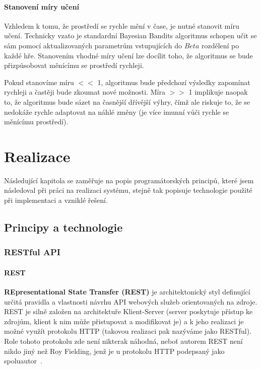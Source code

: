 \documentclass[thesis=M,czech]{FITthesis}[2014/05/07]
\begin{document}
\subsubsection{Stanovení míry učení}
Vzhledem k tomu, že prostředí se rychle mění v čase, je nutné stanovit míru učení. Technicky vzato je standardní Bayesian Bandits algoritmus schopen učit se sám pomocí aktualizovaných parametrům vstupujících do ${Beta}$ rozdělení po každé hře. Stanovením vhodné míry učení lze docílit toho, že algoritmus se bude přizpůsobovat měnícímu se prostředí rychleji.

Pokud stanovíme míru $<<$ 1, algoritmus bude předchozí výsledky zapomínat rychleji a častěji bude zkoumat nové možnosti. Míra $>>$ 1 implikuje naopak to, že algoritmus bude sázet na časnější dřívější výhry, čímž ale riskuje to, že se nedokáže rychle adaptovat na náhlé změny (je více imunní vůči rychle se měnícímu prostředí).
	
\chapter{Realizace}
\label{chap:impl}

Následující kapitola se zaměřuje na popis programátorských principů, které jsem následoval při práci na realizaci systému, stejně tak popisuje technologie použité při implementaci a vzniklé řešení.

\section{Principy a technologie}
\label{sec:sysanalys}

\subsection{RESTful API}
\label{rest}
\subsubsection{REST}
\textbf{REpresentational State Transfer (REST)} je architektonický styl definující určitá pravidla a vlastnosti návrhu API webových služeb orientovaných na zdroje. REST je silně založen na architektuře Klient-Server (server poskytuje přístup ke zdrojům, klient k nim může přistupovat a modifikovat je) a k jeho realizaci je možné využít protokolu HTTP (takovou realizaci pak nazýváme jako RESTful). Role tohoto protokolu zde není nikterak náhodná, neboť autorem REST není nikdo jiný než Roy Fielding, jenž je u protokolu HTTP podepsaný jako spoluautor~\cite{Fielding:2000:ASD:932295}. 
\end{document}
